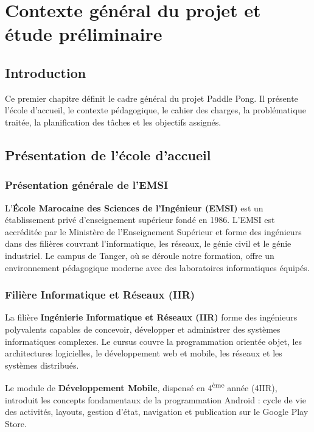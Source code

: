 \documentclass[12pt,a4paper]{report}
\begin{document}
\newpage

\chapter[Contexte et \'etude pr\'eliminaire]{Contexte g\'en\'eral du projet et \'etude pr\'eliminaire}

\section*{Introduction}
Ce premier chapitre d\'efinit le cadre g\'en\'eral du projet Paddle Pong. Il pr\'esente l'\'ecole d'accueil, le contexte p\'edagogique, le cahier des charges, la probl\'ematique trait\'ee, la planification des t\^aches et les objectifs assign\'es.

\section{Pr\'esentation de l'\'ecole d'accueil}
\subsection{Pr\'esentation g\'en\'erale de l'EMSI}
L'\textbf{\'Ecole Marocaine des Sciences de l'Ing\'enieur (EMSI)} est un \'etablissement priv\'e d'enseignement sup\'erieur fond\'e en 1986. L'EMSI est accr\'edit\'ee par le Minist\`ere de l'Enseignement Sup\'erieur et forme des ing\'enieurs dans des fili\`eres couvrant l'informatique, les r\'eseaux, le g\'enie civil et le g\'enie industriel. Le campus de Tanger, o\`u se d\'eroule notre formation, offre un environnement p\'edagogique moderne avec des laboratoires informatiques \'equip\'es.

\subsection{Fili\`ere Informatique et R\'eseaux (IIR)}
La fili\`ere \textbf{Ing\'enierie Informatique et R\'eseaux (IIR)} forme des ing\'enieurs polyvalents capables de concevoir, d\'evelopper et administrer des syst\`emes informatiques complexes. Le cursus couvre la programmation orient\'ee objet, les architectures logicielles, le d\'eveloppement web et mobile, les r\'eseaux et les syst\`emes distribu\'es.

Le module de \textbf{D\'eveloppement Mobile}, dispens\'e en 4\textsuperscript{\`eme} ann\'ee (4IIR), introduit les concepts fondamentaux de la programmation Android : cycle de vie des activit\'es, layouts, gestion d'\'etat, navigation et publication sur le Google Play Store.
\end{document}
